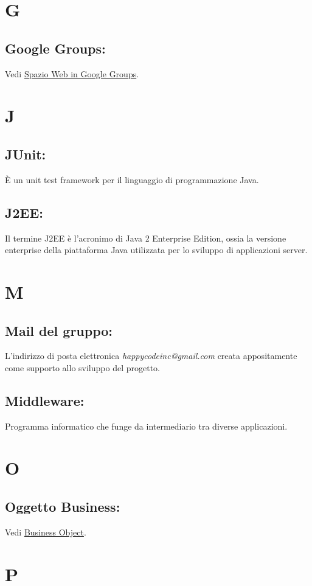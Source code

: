 \chapter{G}
\hypertarget{Google Groups}{}
\section{Google Groups:}
Vedi \hyperlink{Spazio Web in Google Groups}{Spazio Web in Google Groups}.

\chapter{J}
\section{JUnit:}
\`E un unit test framework per il linguaggio di programmazione Java.
\hypertarget{J2EE}{}
\section{J2EE:}
Il termine J2EE \`e l'acronimo di Java 2 Enterprise Edition, ossia la versione enterprise della piattaforma Java utilizzata per lo sviluppo di applicazioni server.

\chapter{M}
\section{Mail del gruppo:}
L'indirizzo di posta elettronica \textit{happycodeinc@gmail.com} creata appositamente come supporto allo sviluppo del progetto.
\section{Middleware:}
Programma informatico che funge da intermediario tra diverse applicazioni.

\chapter{O}
\section{Oggetto Business:}
Vedi \hyperlink{Business Object}{Business Object}.

\chapter{P}
